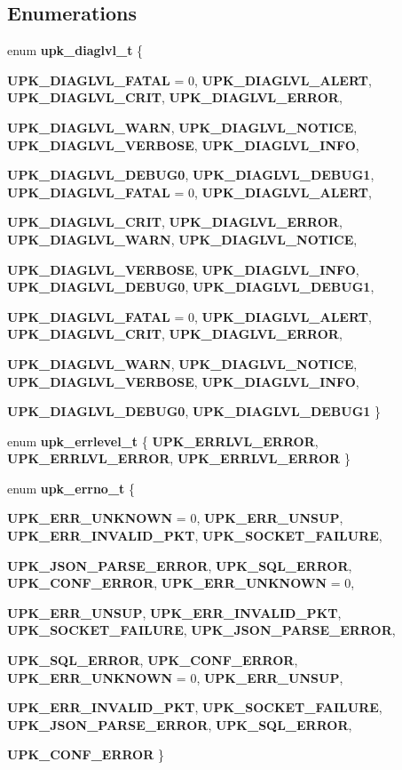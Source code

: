 \subsection*{Enumerations}
\begin{DoxyCompactItemize}
\item 
enum {\bf upk\_\-diaglvl\_\-t} \{ \par
{\bf UPK\_\-DIAGLVL\_\-FATAL} =  0, 
{\bf UPK\_\-DIAGLVL\_\-ALERT}, 
{\bf UPK\_\-DIAGLVL\_\-CRIT}, 
{\bf UPK\_\-DIAGLVL\_\-ERROR}, 
\par
{\bf UPK\_\-DIAGLVL\_\-WARN}, 
{\bf UPK\_\-DIAGLVL\_\-NOTICE}, 
{\bf UPK\_\-DIAGLVL\_\-VERBOSE}, 
{\bf UPK\_\-DIAGLVL\_\-INFO}, 
\par
{\bf UPK\_\-DIAGLVL\_\-DEBUG0}, 
{\bf UPK\_\-DIAGLVL\_\-DEBUG1}, 
{\bf UPK\_\-DIAGLVL\_\-FATAL} =  0, 
{\bf UPK\_\-DIAGLVL\_\-ALERT}, 
\par
{\bf UPK\_\-DIAGLVL\_\-CRIT}, 
{\bf UPK\_\-DIAGLVL\_\-ERROR}, 
{\bf UPK\_\-DIAGLVL\_\-WARN}, 
{\bf UPK\_\-DIAGLVL\_\-NOTICE}, 
\par
{\bf UPK\_\-DIAGLVL\_\-VERBOSE}, 
{\bf UPK\_\-DIAGLVL\_\-INFO}, 
{\bf UPK\_\-DIAGLVL\_\-DEBUG0}, 
{\bf UPK\_\-DIAGLVL\_\-DEBUG1}, 
\par
{\bf UPK\_\-DIAGLVL\_\-FATAL} =  0, 
{\bf UPK\_\-DIAGLVL\_\-ALERT}, 
{\bf UPK\_\-DIAGLVL\_\-CRIT}, 
{\bf UPK\_\-DIAGLVL\_\-ERROR}, 
\par
{\bf UPK\_\-DIAGLVL\_\-WARN}, 
{\bf UPK\_\-DIAGLVL\_\-NOTICE}, 
{\bf UPK\_\-DIAGLVL\_\-VERBOSE}, 
{\bf UPK\_\-DIAGLVL\_\-INFO}, 
\par
{\bf UPK\_\-DIAGLVL\_\-DEBUG0}, 
{\bf UPK\_\-DIAGLVL\_\-DEBUG1}
 \}
\item 
enum {\bf upk\_\-errlevel\_\-t} \{ {\bf UPK\_\-ERRLVL\_\-ERROR}, 
{\bf UPK\_\-ERRLVL\_\-ERROR}, 
{\bf UPK\_\-ERRLVL\_\-ERROR}
 \}
\item 
enum {\bf upk\_\-errno\_\-t} \{ \par
{\bf UPK\_\-ERR\_\-UNKNOWN} =  0, 
{\bf UPK\_\-ERR\_\-UNSUP}, 
{\bf UPK\_\-ERR\_\-INVALID\_\-PKT}, 
{\bf UPK\_\-SOCKET\_\-FAILURE}, 
\par
{\bf UPK\_\-JSON\_\-PARSE\_\-ERROR}, 
{\bf UPK\_\-SQL\_\-ERROR}, 
{\bf UPK\_\-CONF\_\-ERROR}, 
{\bf UPK\_\-ERR\_\-UNKNOWN} =  0, 
\par
{\bf UPK\_\-ERR\_\-UNSUP}, 
{\bf UPK\_\-ERR\_\-INVALID\_\-PKT}, 
{\bf UPK\_\-SOCKET\_\-FAILURE}, 
{\bf UPK\_\-JSON\_\-PARSE\_\-ERROR}, 
\par
{\bf UPK\_\-SQL\_\-ERROR}, 
{\bf UPK\_\-CONF\_\-ERROR}, 
{\bf UPK\_\-ERR\_\-UNKNOWN} =  0, 
{\bf UPK\_\-ERR\_\-UNSUP}, 
\par
{\bf UPK\_\-ERR\_\-INVALID\_\-PKT}, 
{\bf UPK\_\-SOCKET\_\-FAILURE}, 
{\bf UPK\_\-JSON\_\-PARSE\_\-ERROR}, 
{\bf UPK\_\-SQL\_\-ERROR}, 
\par
{\bf UPK\_\-CONF\_\-ERROR}
 \}
\end{DoxyCompactItemize}

